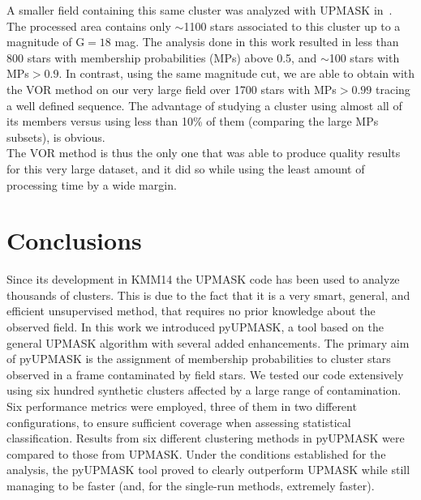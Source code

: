 \documentclass[draft]{aa}
\begin{document}
 A smaller field containing this same cluster was analyzed with UPMASK
 in~\cite{Cantat_2018}. The processed area contains only
 $\sim$1100 stars associated to this cluster up to a magnitude of G${=}18$ mag.
 The analysis done in this work resulted in less than 800 stars
 with membership probabilities (MPs) above 0.5, and $\sim$100 stars with
 MPs$>0.9$. In contrast, using the same magnitude cut, we are able to obtain
 with the VOR method on our very large field over 1700 stars with MPs$>0.99$
 tracing a well defined sequence. The advantage of studying a cluster
 using almost all of its members versus using less than 10\% of them 
 (comparing the large MPs subsets), is obvious.\\

 The VOR method is thus the only one that was able to produce quality results
 for this very large dataset, and it did so while using the least amount of
 processing time by a wide margin.








\section{Conclusions}
 \label{sec:conclusions}

 Since its development in KMM14 the UPMASK code has been used to analyze
 thousands of clusters. This is due to the fact that it is a very
 smart, general, and efficient unsupervised method, that requires no prior
 knowledge about the observed field.
 In this work we introduced pyUPMASK, a tool based on the general UPMASK
 algorithm with several added enhancements. The primary aim of pyUPMASK is the
 assignment of membership probabilities to cluster stars observed in a frame
 contaminated by field stars.
 We tested our code extensively using six hundred synthetic clusters affected
 by a large range of contamination. Six performance metrics were employed,
 three of them in two different configurations, to ensure sufficient coverage
 when assessing statistical classification.
 Results from six different clustering methods in pyUPMASK were compared to
 those from UPMASK.
 Under the conditions established for the analysis, the pyUPMASK tool proved to
 clearly outperform UPMASK 
 while still managing to be faster (and, for the single-run methods, extremely
 faster).
\end{document}
